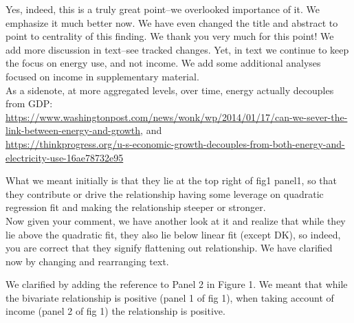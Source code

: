 Yes, indeed, this is a truly great point--we overlooked importance of it. We emphasize it much
better now. We have even changed the title and abstract to point to centrality of
this finding. We thank you very much for this point! We add more discussion in
text--see tracked changes.
Yet, in text we continue to keep the focus on energy use, and not income. We add
 some additional analyses focused on income in supplementary material.
\\

As a sidenote, at more aggregated levels, over time, energy  actually decouples from GDP:\\
{\footnotesize
\url{https://www.washingtonpost.com/news/wonk/wp/2014/01/17/can-we-sever-the-link-between-energy-and-growth}, and\\
\url{https://thinkprogress.org/u-s-economic-growth-decouples-from-both-energy-and-electricity-use-16ae78732e95}
}


What we meant initially is that they lie at the top right of fig1
panel1, so that they contribute or drive the relationship having some leverage
on quadratic regression fit and making the relationship steeper or stronger. 
\\

Now given your comment, we have another look at it and realize that while they
lie above the quadratic fit, they also lie below linear fit (except DK), so
indeed, you are correct that they signify flattening out relationship.
We have clarified now by changing and rearranging text.



We clarified by adding the reference to Panel 2 in Figure 1. We meant that while
 the bivariate relationship is positive (panel 1 of fig 1),  when taking
 account of income (panel 2 of fig 1) the relationship is positive.

